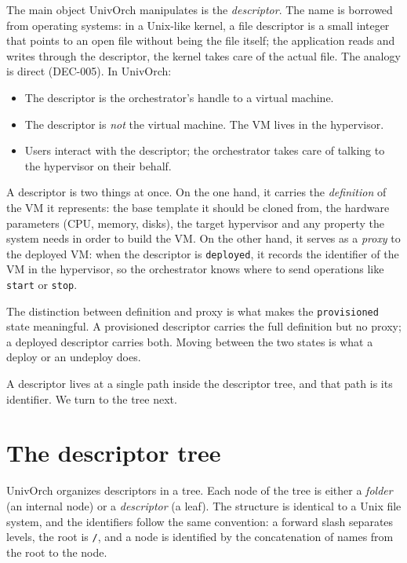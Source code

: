 The main object UnivOrch manipulates is the \emph{descriptor}. The
name is borrowed from operating systems: in a Unix-like kernel, a
file descriptor is a small integer that points to an open file
without being the file itself; the application reads and writes
through the descriptor, the kernel takes care of the actual file.
The analogy is direct (DEC-005). In UnivOrch:

\begin{itemize}
  \item The descriptor is the orchestrator's handle to a virtual
        machine.
  \item The descriptor is \emph{not} the virtual machine. The VM
        lives in the hypervisor.
  \item Users interact with the descriptor; the orchestrator takes
        care of talking to the hypervisor on their behalf.
\end{itemize}

A descriptor is two things at once. On the one hand, it carries the
\emph{definition} of the VM it represents: the base template it
should be cloned from, the hardware parameters (CPU, memory, disks),
the target hypervisor and any property the system needs in order to
build the VM. On the other hand, it serves as a \emph{proxy} to the
deployed VM: when the descriptor is \texttt{deployed}, it records
the identifier of the VM in the hypervisor, so the orchestrator
knows where to send operations like \texttt{start} or \texttt{stop}.

The distinction between definition and proxy is what makes the
\texttt{provisioned} state meaningful. A provisioned descriptor
carries the full definition but no proxy; a deployed descriptor
carries both. Moving between the two states is what a deploy or an
undeploy does.

A descriptor lives at a single path inside the descriptor tree, and
that path is its identifier. We turn to the tree next.

\section{The descriptor tree}
\label{sec:arbol}

UnivOrch organizes descriptors in a tree. Each node of the tree is
either a \emph{folder} (an internal node) or a \emph{descriptor}
(a leaf). The structure is identical to a Unix file system, and the
identifiers follow the same convention: a forward slash separates
levels, the root is \texttt{/}, and a node is identified by the
concatenation of names from the root to the node.

